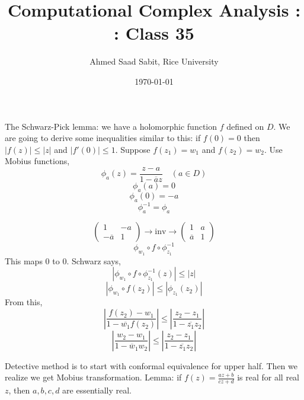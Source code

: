 \documentclass[letter]{article}
\title{Computational Complex Analysis : : Class 35}
\author{Ahmed Saad Sabit, Rice University}
\date{\today}
\begin{document}
\maketitle
The Schwarz-Pick lemma: we have a holomorphic function $f$ defined on $D$. We are going to derive some inequalities similar to this: if $f(0) = 0$ then $|f(z)| \le |z|$ and $|f'(0)| \le 1 $. Suppose $f(z_1)= w_1$ and $f(z_2) = w_2$. Use Mobius functions, 
\[
\phi_a(z) = \frac{z- a }{1 - \overline{a} z} \quad (a \in D)
\]
\[
\phi_a(a) = 0
\] 
\[
\phi_a(0) = -a
\] 
\[
\phi_a^{-1} = \phi_a
\]

\[
	\begin{pmatrix} 1 & - a \\ - \overline{a} & 1 \end{pmatrix}  \to \text{inv} \to 
	\begin{pmatrix} 1 & a \\ \overline{a} & 1 \end{pmatrix} 
\]
\[
	\phi_{w_1} \circ f \circ \phi_{z_1}^{-1} 
\] 
This maps $0$ to $0$. Schwarz says, 
\[
	| \phi_{w_1} \circ f \circ \phi_{z_1}^{-1}(z) | \le |z|
\]
\[
|\phi_{w_1} \circ f(z_2) | \le |\phi_{z_1} (z_2) | 
\]
From this, 
\[\left|
\frac{f(z_2) - w_1}{1 - \overline{w_1} f(z_2)} 
\right| \le 
\left| 
\frac{z_2 - z_1}{1 - \overline{z_1} z_2} 
\right| 
\]
\[
\left| 
\frac{w_2 - w_1}{1 - \overline{w}_1 w_2} \right| \le 
\left| 
\frac{z_2 - z_1}{1 - \overline{z_1}z_2} \right|
\] 

Detective method is to start with conformal equivalence for upper half. Then we realize we get Mobius transformation. Lemma: 
if $f(z) = \frac{az + b}{cz + d}$ is real for all real $z$, then $a,b,c,d$ are essentially real. 
\end{document}
